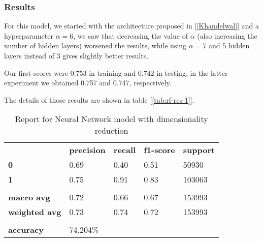 \subsubsection{Results}

For this model, we started with the architecture proposed in [\ref{Khandelwal}] and a hyperparameter $\alpha=6$, we saw that decreasing the value of $\alpha$ (also increasing the number of hidden layers) worsened the results, while using $\alpha=7$ and 5 hidden layers instead of 3 gives slightly better results.

Our first scores were 0.753 in training and 0.742 in testing, in the latter experiment we obtained 0.757 and 0.747, respectively.

The details of those results are shown in table [\ref{tab:rf-res-1}].

\begin{table}[h!]   %
    \centering
    \begin{tabular}{lllll}
        \rowcolor[HTML]{EEEEEE} 
        \cellcolor[HTML]{FBFBFB} & \textbf{precision} & \textbf{recall} & \textbf{f1-score} & \textbf{support} \\
        \rowcolor[HTML]{EEEEEE} 
        \textbf{0}               & 0.69               & 0.40            & 0.51              & 50930            \\
        \rowcolor[HTML]{EEEEEE} 
        \textbf{1}               & 0.75               & 0.91            & 0.83              & 103063           \\
        \rowcolor[HTML]{FBFBFB} 
        &                    &                 &                   &                  \\
        \rowcolor[HTML]{EEEEEE} 
        \textbf{macro avg}       & 0.72               & 0.66            & 0.67              & 153993           \\
        \rowcolor[HTML]{EEEEEE} 
        \textbf{weighted avg}    & 0.73               & 0.74            & 0.72              & 153993           \\
        \rowcolor[HTML]{FBFBFB} 
        &                    &                 &                   &                  \\
        \rowcolor[HTML]{EEEEEE} 
        \textbf{accuracy}        & \multicolumn{4}{l}{\cellcolor[HTML]{EEEEEE}74.204\%}                         
    \end{tabular}
    \caption{Report for Neural Network model with dimensionality reduction}
    \label{tab:nn-res-1}
\end{table}

